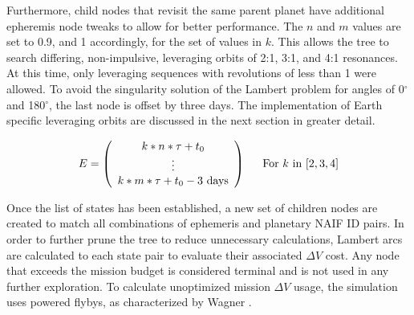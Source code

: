 \documentclass[letterpaper, preprint, paper,11pt]{AAS}	%
\begin{document}
Furthermore, child nodes that revisit the same parent planet have additional epheremis node tweaks to allow for better performance. The $n$ and $m$ values are set to 0.9, and 1 accordingly, for the set of values in $k$. This allows the tree to search differing, non-impulsive, leveraging orbits of 2:1, 3:1, and 4:1 resonances. At this time, only leveraging sequences with revolutions of less than 1 were allowed. To avoid the singularity solution of the Lambert problem for angles of 0$^\circ$ and 180$^\circ$, the last node is offset by three days. The implementation of Earth specific leveraging orbits are discussed in the next section in greater detail.

\begin{equation*}
    \label{eq:ephemArrayLev}
    E =
    \left(\begin{array}{c}
        k*n*\tau + t_0 \\
        \vdots \\
        k*m*\tau + t_0 - 3 \text{ days} \\
    \end{array}\right)\hspace{1.5em}
    \text{For } k \text{ in } [2, 3, 4]
\end{equation*}

Once the list of states has been established, a new set of children nodes are created to match all combinations of ephemeris and planetary NAIF ID pairs. In order to further prune the tree to reduce unnecessary calculations, Lambert arcs are calculated to each state pair to evaluate their associated $\Delta V$ cost. Any node that exceeds the mission budget is considered terminal and is not used in any further exploration. To calculate unoptimized mission $\Delta V$ usage, the simulation uses powered flybys, as characterized by Wagner \cite{Wagner2015}.
\end{document}
